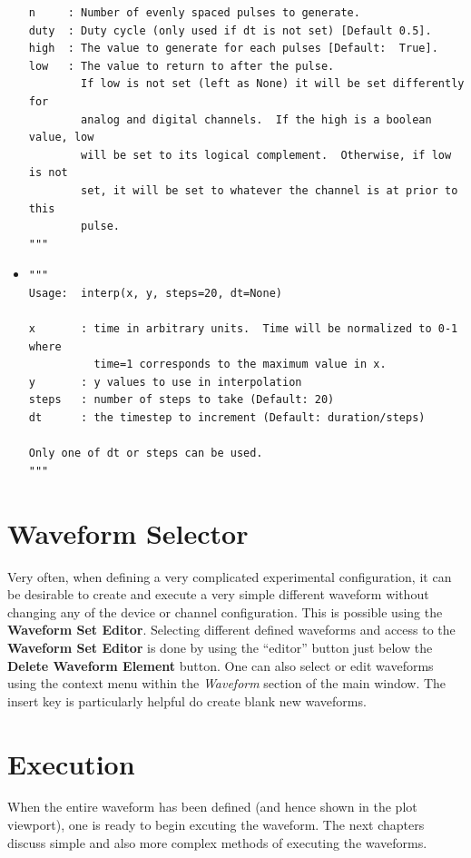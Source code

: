 \begin{itemize}
\begin{lstlisting}
n     : Number of evenly spaced pulses to generate.
duty  : Duty cycle (only used if dt is not set) [Default 0.5].
high  : The value to generate for each pulses [Default:  True].
low   : The value to return to after the pulse.
        If low is not set (left as None) it will be set differently for
        analog and digital channels.  If the high is a boolean value, low
        will be set to its logical complement.  Otherwise, if low is not
        set, it will be set to whatever the channel is at prior to this
        pulse.
"""
\end{lstlisting}

\item {}
\begin{lstlisting}
"""
Usage:  interp(x, y, steps=20, dt=None)

x       : time in arbitrary units.  Time will be normalized to 0-1 where
          time=1 corresponds to the maximum value in x.
y       : y values to use in interpolation
steps   : number of steps to take (Default: 20)
dt      : the timestep to increment (Default: duration/steps)

Only one of dt or steps can be used.
"""
\end{lstlisting}
\end{itemize}


\section{Waveform Selector}
Very often, when defining a very complicated experimental configuration, it can
be desirable to create and execute a very simple different waveform without
changing any of the device or channel configuration.  This is possible using the
\textbf{Waveform Set Editor}.  Selecting different defined waveforms and access
to the \textbf{Waveform Set Editor} is done by using the ``editor'' button just
below the \textbf{Delete Waveform Element} button.  One can also select or edit
waveforms using the context menu within the \textit{Waveform} section of the
main window.  The insert key is particularly helpful do create blank new waveforms.


\section{Execution}
When the entire waveform has been defined (and hence shown in the plot
viewport), one is ready to begin excuting the waveform.  The next chapters
discuss simple and also more complex methods of executing the waveforms.
